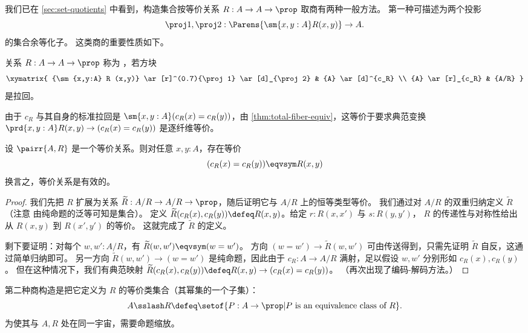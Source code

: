 我们已在 \cref{sec:set-quotients} 中看到，构造集合按等价关系 $R:A\to A\to\prop$ 取商有两种一般方法。
第一种可描述为两个投影
\[\proj1,\proj2:\Parens{\sm{x,y:A} R(x,y)} \to A.\]
的集合余等化子。
这类商的重要性质如下。

\begin{defn}
  关系 $R:A\to A\to\prop$ 称为
  ，若方块
\begin{equation*}
  \xymatrix{
    {\sm{x,y:A} R (x,y)}
    \ar[r]^(0.7){\proj1}
    \ar[d]_{\proj2}
    &
    {A}
    \ar[d]^{c_R}
    \\
    {A}
    \ar[r]_{c_R}
    &
    {A/R}
    }
\end{equation*}
是拉回。
\end{defn}

由于 $c_R$ 与其自身的标准拉回是 $\sm{x,y:A} (c_R(x)=c_R(y))$，由 \cref{thm:total-fiber-equiv}，这等价于要求典范变换 $\prd{x,y:A} R(x,y) \to (c_R(x)=c_R(y))$ 是逐纤维等价。

\begin{lem}\label{lem:sets_exact}
设 $\pairr{A,R}$ 是一个等价关系。则对任意 $x,y:A$，存在等价
\begin{equation*}
(c_R(x)= c_R(y))\eqvsym R(x,y)
\end{equation*}
换言之，等价关系是有效的。
\end{lem}

\begin{proof}
我们先把 $R$ 扩展为关系 $\widetilde{R}:A/R\to A/R\to\prop$，随后证明它与 $A/R$ 上的恒等类型等价。
我们通过对
$A/R$ 的双重归纳定义 $\widetilde{R}$（注意 \prop 由纯命题的泛等可知是集合）。
定义 $\widetilde{R}(c_R(x),c_R(y)) \defeq R(x,y)$。给定 $r:R(x,x')$ 与 $s:R(y,y')$，
$R$ 的传递性与对称性给出从 $R(x,y)$ 到 $R(x',y')$ 的等价。
这就完成了
$\widetilde{R}$ 的定义。

剩下要证明：对每个 $w,w':A/R$，有 $\widetilde{R}(w,w')\eqvsym (w= w')$。
方向 $(w=w')\to \widetilde{R}(w,w')$ 可由传送得到，只需先证明 $\widetilde{R}$ 自反，这通过简单归纳即可。
另一方向 $\widetilde{R}(w,w')\to (w= w')$ 是纯命题，因此由于 $c_R:A\to A/R$ 满射，足以假设 $w,w'$ 分别形如 $c_R(x),c_R(y)$。
但在这种情况下，我们有典范映射 $\widetilde{R}(c_R(x),c_R(y)) \defeq R(x,y) \to (c_R(x)=c_R(y))$。
（再次出现了编码-解码方法。）
\end{proof}

第二种商构造是把它定义为 $R$ 的等价类集合（其幂集的一个子集）：
\[ A\sslash R \defeq \setof{ P:A\to\prop | P \text{ is an equivalence class of } R}. \]
为使其与 $A,R$ 处在同一宇宙，需要命题缩放。

